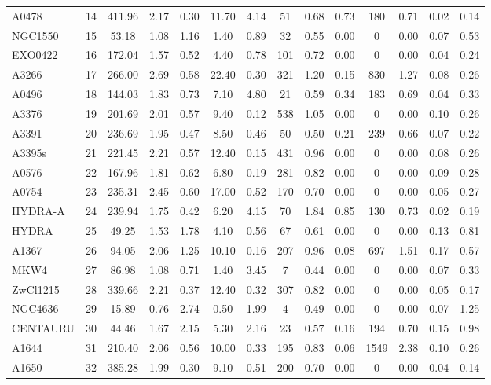 \documentclass[10pt,aps,pra,reprint,amsmath,amsfonts,amssymb,showpacs,nofootinbib,floatfix]{revtex4-1}
\newcommand{\vst}{\vspace{-0.14mm}}
\begin{document}
\begin{table}
\begin{minipage}{2.0\columnwidth}
\begin{tabular}{l c c c c c c c c c c c c c}
A0478 & 14 & 411.96 & 2.17 & 0.30 & 11.70 & 4.14 & 51 & 0.68 & 0.73 & 180 & 0.71 & 0.02 & 0.14 \vst \\
NGC1550 & 15 & 53.18 & 1.08 & 1.16 & 1.40 & 0.89 & 32 & 0.55 & 0.00 & 0 & 0.00 & 0.07 & 0.53 \vst \\
EXO0422 & 16 & 172.04 & 1.57 & 0.52 & 4.40 & 0.78 & 101 & 0.72 & 0.00 & 0 & 0.00 & 0.04 & 0.24 \vst \\
A3266 & 17 & 266.00 & 2.69 & 0.58 & 22.40 & 0.30 & 321 & 1.20 & 0.15 & 830 & 1.27 & 0.08 & 0.26 \vst \\
A0496 & 18 & 144.03 & 1.83 & 0.73 & 7.10 & 4.80 & 21 & 0.59 & 0.34 & 183 & 0.69 & 0.04 & 0.33 \vst \\
A3376 & 19 & 201.69 & 2.01 & 0.57 & 9.40 & 0.12 & 538 & 1.05 & 0.00 & 0 & 0.00 & 0.10 & 0.26 \vst \\
A3391 & 20 & 236.69 & 1.95 & 0.47 & 8.50 & 0.46 & 50 & 0.50 & 0.21 & 239 & 0.66 & 0.07 & 0.22 \vst \\
A3395s & 21 & 221.45 & 2.21 & 0.57 & 12.40 & 0.15 & 431 & 0.96 & 0.00 & 0 & 0.00 & 0.08 & 0.26 \vst \\
A0576 & 22 & 167.96 & 1.81 & 0.62 & 6.80 & 0.19 & 281 & 0.82 & 0.00 & 0 & 0.00 & 0.09 & 0.28 \vst \\
A0754 & 23 & 235.31 & 2.45 & 0.60 & 17.00 & 0.52 & 170 & 0.70 & 0.00 & 0 & 0.00 & 0.05 & 0.27 \vst \\
HYDRA-A & 24 & 239.94 & 1.75 & 0.42 & 6.20 & 4.15 & 70 & 1.84 & 0.85 & 130 & 0.73 & 0.02 & 0.19 \vst \\
HYDRA & 25 & 49.25 & 1.53 & 1.78 & 4.10 & 0.56 & 67 & 0.61 & 0.00 & 0 & 0.00 & 0.13 & 0.81 \vst \\
A1367 & 26 & 94.05 & 2.06 & 1.25 & 10.10 & 0.16 & 207 & 0.96 & 0.08 & 697 & 1.51 & 0.17 & 0.57 \vst \\
MKW4 & 27 & 86.98 & 1.08 & 0.71 & 1.40 & 3.45 & 7 & 0.44 & 0.00 & 0 & 0.00 & 0.07 & 0.33 \vst \\
ZwCl1215 & 28 & 339.66 & 2.21 & 0.37 & 12.40 & 0.32 & 307 & 0.82 & 0.00 & 0 & 0.00 & 0.05 & 0.17 \vst \\
NGC4636 & 29 & 15.89 & 0.76 & 2.74 & 0.50 & 1.99 & 4 & 0.49 & 0.00 & 0 & 0.00 & 0.07 & 1.25 \vst \\
CENTAURU & 30 & 44.46 & 1.67 & 2.15 & 5.30 & 2.16 & 23 & 0.57 & 0.16 & 194 & 0.70 & 0.15 & 0.98 \vst \\
A1644 & 31 & 210.40 & 2.06 & 0.56 & 10.00 & 0.33 & 195 & 0.83 & 0.06 & 1549 & 2.38 & 0.10 & 0.26 \vst \\
A1650 & 32 & 385.28 & 1.99 & 0.30 & 9.10 & 0.51 & 200 & 0.70 & 0.00 & 0 & 0.00 & 0.04 & 0.14 \vst \\

\end{tabular}
\end{minipage}
\end{table}
\end{document}
